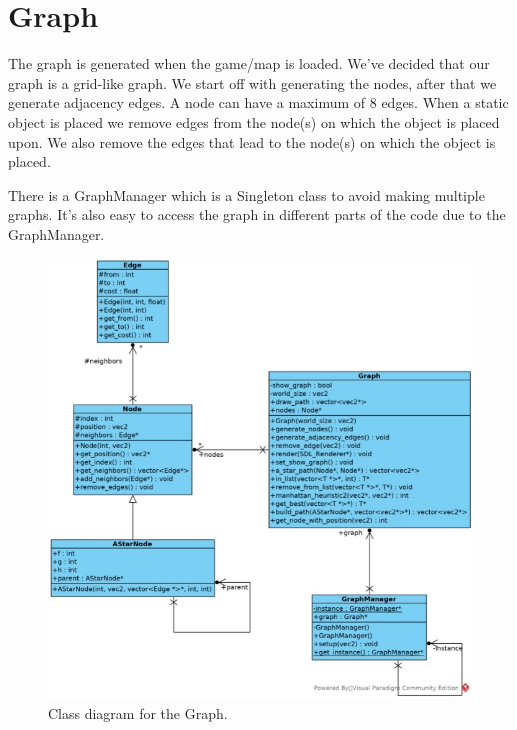 \section{Graph}
The graph is generated when the game/map is loaded. We’ve decided that our graph is a grid-like graph. We start off with generating the nodes, after that we generate adjacency edges. A node can have a maximum of 8 edges. When a static object is placed we remove edges from the node(s) on which the object is placed upon. We also remove the edges that lead to the node(s) on which the object is placed.

There is a GraphManager which is a Singleton class to avoid making multiple graphs. It's also easy to access the graph in different parts of the code due to the GraphManager. 

\begin{figure}[!htb]
    \centering
    \includegraphics[scale=0.75]{res/graph.jpg}
    \caption{Class diagram for the Graph.}\label{fig:blue-line}
\end{figure}